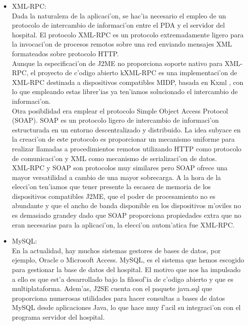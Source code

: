\begin{itemize}
\item XML-RPC:\bigskip \\Dada la naturaleza de la aplicaci'on, se hac'ia necesario el empleo de un protocolo de intercambio de informaci'on entre el PDA y el servidor del hospital. El protocolo XML-RPC es un protocolo extremadamente ligero para la invocaci'on de procesos remotos sobre una red enviando mensajes XML formateados sobre protocolo HTTP. \bigskip \\Aunque la especificaci'on de J2ME no proporciona soporte nativo para XML-RPC, el proyecto de c'odigo abierto kXML-RPC es una implementaci'on de XML-RPC destinada a dispositivos compatibles MIDP, basada en Kxml , con lo que empleando estas librer'ias ya ten'iamos solucionado el intercambio de informaci'on.\bigskip \\Otra posibilidad era emplear el protocolo Simple Object Access Protocol (SOAP). SOAP es un protocolo ligero de intercambio de informaci'on estructurada en un entorno descentralizado y distribuido. La idea subyace en la creaci'on de este protocolo es proporcionar un mecanismo uniforme para realizar llamadas a procedimientos remotos utilizando HTTP como protocolo de comunicaci'on y XML  como mecanismo de serializaci'on de datos.\bigskip \\XML-RPC y SOAP son protocolos muy similares pero SOAP ofrece una mayor versatilidad a cambio de una mayor sobrecarga. A la hora de la elecci'on ten'iamos que tener presente la escasez de memoria de los dispositivos compatibles J2ME, que el poder de procesamiento no es abundante y que el ancho de banda disponible en los dispositivos m'oviles no es demasiado grandey dado que SOAP proporciona propiedades extra que no eran necesarias para la aplicaci'on, la elecci'on autom'atica fue XML-RPC.

\item MySQL:\bigskip \\En la actualidad, hay muchos sistemas gestores de bases de datos, por ejemplo, Oracle o Microsoft Access. MySQL, es el sistema que hemos escogido para gestionar la base de datos del hospital. El motivo que nos ha impulsado a ello es que est'a desarrollado bajo la filosof'ia de c'odigo abierto y que es multiplataforma. Adem'as, J2SE cuenta con el paquete java.sql que proporciona numerosas utilidades para hacer consultas a bases de datos MySQL desde aplicaciones Java, lo que hace muy f'acil su integraci'on con el programa servidor del hospital.


\end{itemize}
